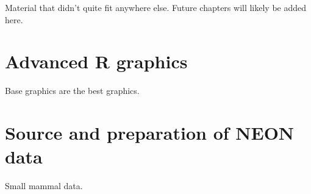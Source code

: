 \documentclass[
  13,
  letterpaper,
]{report}
\begin{document}
Material that didn't quite fit anywhere else. Future chapters will
likely be added here.

\chapter{Advanced R graphics}\label{sec-28}

Base graphics are the best graphics.

\cleardoublepage
{}
{}
\appendix

\chapter{Source and preparation of NEON data}\label{sec-29}

Small mammal data.
\end{document}
